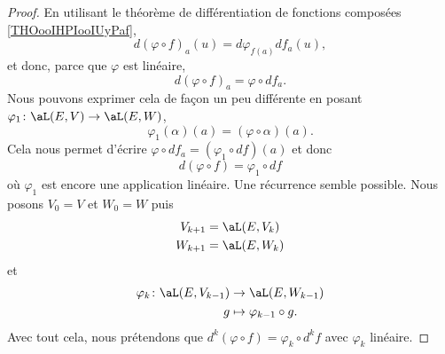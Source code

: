 \begin{proof}
	En utilisant le théorème de différentiation de fonctions composées \ref{THOooIHPIooIUyPaf},
	\begin{equation}
		d(\varphi\circ f)_a(u)=d\varphi_{f(a)}df_a(u),
	\end{equation}
	et donc, parce que \( \varphi\) est linéaire,
	\begin{equation}
		d(\varphi\circ f)_a=\varphi\circ df_a.
	\end{equation}
	Nous pouvons exprimer cela de façon un peu différente en posant \( \varphi_1\colon \aL(E,V)\to \aL(E,W)\),
	\begin{equation}
		\varphi_1(\alpha)(a)=(\varphi\circ \alpha)(a).
	\end{equation}
	Cela nous permet d'écrire \( \varphi\circ df_a=(\varphi_1\circ df)(a)\) et donc
	\begin{equation}        \label{EQooUJPWooTzgSJx}
		d(\varphi\circ f)=\varphi_1\circ df
	\end{equation}
	où \( \varphi_1\) est encore une application linéaire. Une récurrence semble possible. Nous posons \( V_0=V\) et \( W_0=W\) puis
	\begin{subequations}
		\begin{align}
			V_{k+1} & =\aL(E,V_k) \\
			W_{k+1} & =\aL(E,W_k)
		\end{align}
	\end{subequations}
	et
	\begin{equation}
		\begin{aligned}
			\varphi_k\colon \aL(E,V_{k-1}) & \to \aL(E,W_{k-1})            \\
			g                              & \mapsto \varphi_{k-1}\circ g.
		\end{aligned}
	\end{equation}
	Avec tout cela, nous prétendons que \( d^k(\varphi\circ f)=\varphi_k\circ d^kf\) avec \( \varphi_k\) linéaire.


\end{proof}
